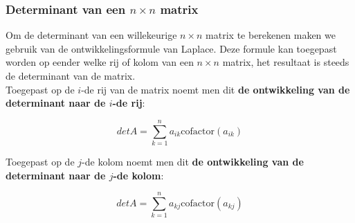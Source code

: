 \subsubsection{Determinant van een $n \times n$ matrix}

Om de determinant van een willekeurige $n \times n$ matrix te berekenen maken we gebruik van de ontwikkelingsformule van Laplace. Deze formule kan toegepast worden op eender welke rij of kolom van een $n \times n$ matrix, het resultaat is steeds de determinant van de matrix.\\

Toegepast op de $i$-de rij van de matrix noemt men dit {\bf de ontwikkeling van de determinant naar de $i$-de rij}:

\[ det A=\sum\limits_{k=1}^{n} a_{ik}\text{cofactor}(a_{ik}) \] 


Toegepast op de $j$-de kolom noemt men dit {\bf de ontwikkeling van de determinant naar de $j$-de kolom}:

	
\[ det A=\sum\limits_{k=1}^{n} a_{kj}\text{cofactor}(a_{kj}) \]


